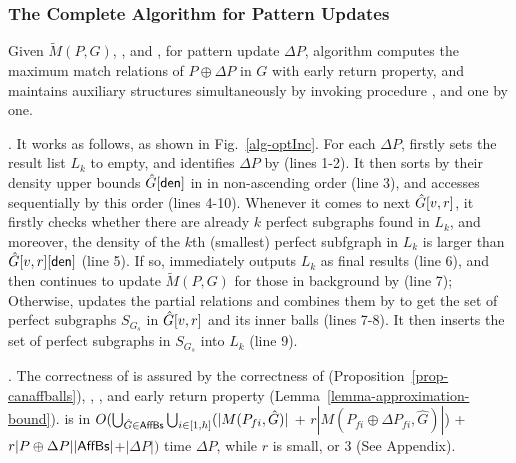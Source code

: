 \subsubsection{The Complete Algorithm for Pattern Updates}
\label{subsubsec-completedynamicP}

Given $\tilde{M}(P,G)$, \fb, \bfc and \upl, for pattern update $\Delta P$,
algorithm \incp computes the maximum match relations of $P \oplus \Delta P$ in $G$ with early return property, and maintains auxiliary structures simultaneously by invoking procedure \identifyaffball, \incmatch and \comb one by one.

. It works as follows, as shown in Fig.~\ref{alg-optInc}.
For each $\Delta P$, \incp firstly sets the result list $L_{k}$ to empty,
and identifies \affballsx \wrt $\Delta P$ by \identifyaffball (lines 1-2).
It then sorts \affballsx by their density upper bounds $\hat{G}{}[{\mathsf{den}}]$ in \bs in non-ascending order (line 3),
and accesses \affballsx sequentially by this order (lines 4-10).
Whenever it comes to next \affballx $\hat{G}{[v,r]}$, it firstly checks whether there are already $k$ perfect subgraphs found in $L_{k}$, and moreover,
the density of the $k$th (smallest) perfect subfgraph in $L_{k}$ is larger than $\hat{G}{[v,r]}[{\mathsf{den}}]$ (line 5).
If so, \incp immediately outputs $L_{k}$ as final results (line 6),
and then continues to update $\tilde{M}(P,G)$ for those \affballsx in background by \incmatch (line 7);
Otherwise, \incp updates the partial relations and combines them by \comb to get the set of perfect subgraphs $S_{G_s}$ in $\hat{G}{[v,r]}$ and its inner balls (lines 7-8).
It then inserts the set of perfect subgraphs in $S_{G_s}$ into $L_{k}$ (line 9).

.
The correctness of \incp is assured by the correctness of \identifyaffball (Proposition~\ref{prop-canaffballs}), \incmatch, \comb, and early return property (Lemma~\ref{lemma-approximation-bound}).
\incp is in $O(\bigcup_{\hat{G}\in {\ensuremath {\mathsf{AffBs}}}}\bigcup_{i\in[1,h]}(|M(P_{fi}, \hat{G})|$ + $r|M(P_{fi} \oplus \Delta P_{fi}, \hat{G})|$) + $r|P \oplus \Delta P||{\mathsf{AffBs}}|$+$|\Delta P|)$ time \wrt $\Delta P$, while $r$ is small,  or 3 (See Appendix).


